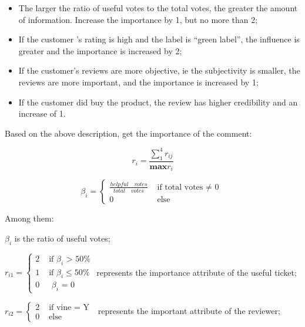 \documentclass{mcmthesis}
\begin{document}
\begin{itemize}

\item The larger the ratio of useful votes to the total votes, the greater the amount of information. Increase the importance by 1, but no more than 2;

\item If the customer ’s rating is high and the label is “green label”, the influence is greater and the importance is increased by 2;

\item If the customer's reviews are more objective, ie the subjectivity is smaller, the reviews are more important, and the importance is increased by 1;

\item If the customer did buy the product, the review has higher credibility and an increase of 1.

\end{itemize}

Based on the above description, get the importance of the comment:

\begin{equation}
r_{i}=\frac{\sum_{1}^{4}r_{ij}}{\mathbf{max} r_i}
\end{equation}

\begin{equation}
\beta_i=\left\{\begin{array}{ll}
\frac{helpful\quad votes}{total\quad votes} & \text { if total votes $\neq$ 0 } \\
0 & \text { else }
\end{array}\right.
\end{equation}

Among them:

$\beta_i$ is the ratio of useful votes;

$
r_{i1}=\left\{\begin{array}{ll}
2 & \text { if $\beta_i$ > 50\% } \\
1 & \text { if $\beta_i \leq $50\% } \\
0 & \text { $\beta_i$ = 0 }
\end{array}\right.
$
represents the importance attribute of the useful ticket;

$
r_{i2}=\left\{\begin{array}{ll}
2 & \text { if vine = Y } \\
0 & \text { else }
\end{array}\right.
$
represents the important attribute of the reviewer;
\end{document}

